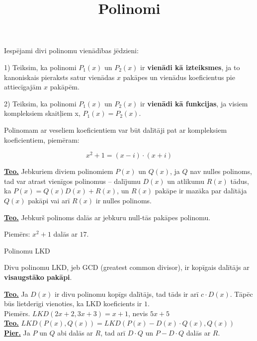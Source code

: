 \documentclass[12pt]{article}
\title{Polinomi}
\author{}
\date{}
\begin{document}
\maketitle


Iespējami divi polinomu vienādības jēdzieni:

1) Teiksim, ka polinomi $P_1(x)$ un $P_2(x)$ ir \textbf{vienādi kā izteiksmes}, ja to kanoniskais pieraksts satur vienādas $x$ pakāpes un vienādus koeficientus pie attiecīgajām $x$ pakāpēm.

2) Teiksim, ka polinomi $P_1(x)$ un $P_2(x)$ ir \textbf{vienādi kā funkcijas}, ja visiem kompleksiem skaitļiem x, $P_1(x) = P_2(x)$.

Polinomam ar veseliem koeficientiem var būt dalītāji pat ar kompleksiem koeficientiem, piemēram:

$$
x^2 + 1 = (x - i) \cdot (x + i)
$$

\pagebreak

\textbf{\underline{Teo.}}  Jebkuriem diviem polinomiem $P(x)$ un $Q(x)$, ja $Q$ nav nulles polinoms, tad var atrast vienīgos polinomus – dalījumu $D(x)$ un atlikumu $R(x)$ tādus, ka
$P(x)=Q(x)D(x)+R(x)$, un $R(x)$ pakāpe ir mazāka par dalītāja $Q(x)$ pakāpi vai arī $R(x)$ ir nulles polinoms.


\textbf{\underline{Teo.}} Jebkurš polinoms dalās ar jebkuru null-tās pakāpes polinomu.

Piemērs: $x^2+1$ dalās ar $17$.

\pagebreak

Polinomu LKD

Divu polinomu LKD, jeb GCD (greatest common divisor),  ir kopīgais dalītājs ar \textbf{visaugstāko pakāpi}.

\textbf{\underline{Teo.}} Ja $D(x)$ ir divu polinomu kopīgs dalītājs, tad tāds ir arī $c \cdot D(x)$. Tāpēc būs lietderīgi vienoties, ka LKD koeficients ir $1$. \\
Piemērs. $LKD(2x+2, 3x+3) = x+1$, nevis $5x+5$ \\

\textbf{\underline{Teo.}}  $ LKD(P(x), Q(x)) = LKD(P(x) - D(x) \cdot Q(x), Q(x)) $ \\
\textbf{\underline{Pier.}} Ja $P$ un $Q$ abi dalās ar $R$, tad arī $D \cdot Q$ un $P - D \cdot Q$
dalās ar $R$. \\
\end{document}
